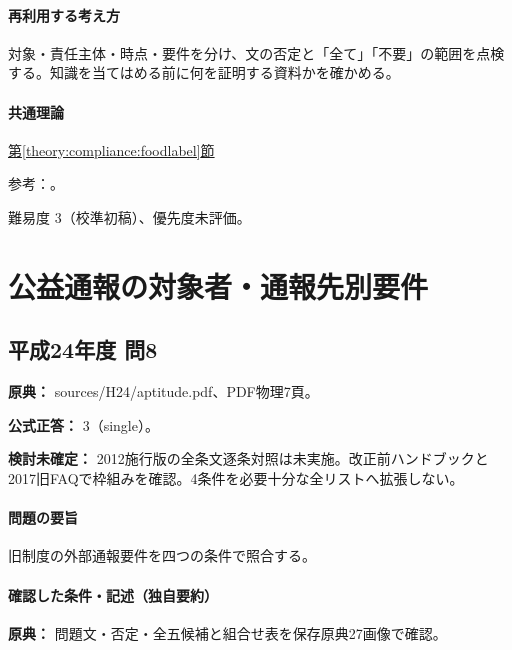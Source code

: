 \paragraph{再利用する考え方} 対象・責任主体・時点・要件を分け、文の否定と「全て」「不要」の範囲を点検する。知識を当てはめる前に何を証明する資料かを確かめる。

\paragraph{共通理論} \hyperref[theory:compliance:foodlabel]{第\ref*{theory:compliance:foodlabel}節}

\par 参考：\cite{saf53_food_notice,saf53_food_loss2013,saf53_food_expiry}。

\par 難易度 3（校準初稿）、優先度未評価。

\section{公益通報の対象者・通報先別要件}

\subsection{平成24年度 問8}
\label{q:h24-reg-apt-08}

\noindent\textbf{原典：} sources/H24/aptitude.pdf、PDF物理7頁。

\textbf{公式正答：} 3（single）。

\par\textbf{検討未確定：} 2012施行版の全条文逐条対照は未実施。改正前ハンドブックと2017旧FAQで枠組みを確認。4条件を必要十分な全リストへ拡張しない。

\paragraph{問題の要旨} 旧制度の外部通報要件を四つの条件で照合する。

\paragraph{確認した条件・記述（独自要約）}\mbox{}\par

\noindent\textbf{原典：} 問題文・否定・全五候補と組合せ表を保存原典27画像で確認。\par

